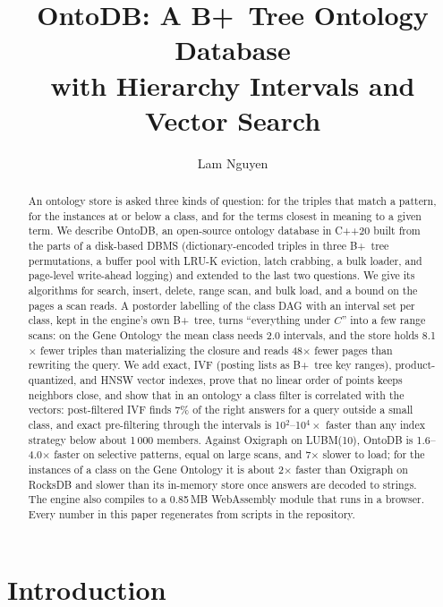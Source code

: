 \documentclass[sigconf, nonacm]{acmart}
\newcommand{\sys}{OntoDB}
\begin{document}
\title{OntoDB: A B+~Tree Ontology Database\\with Hierarchy Intervals and Vector Search}
\author{Lam Nguyen}

\renewcommand{\shortauthors}{Nguyen}

\begin{abstract}
An ontology store is asked three kinds of question: for the triples that match a pattern, for the instances at or below a class, and for the terms closest in meaning to a given term. We describe \sys, an open-source ontology database in C++20 built from the parts of a disk-based DBMS (dictionary-encoded triples in three B+~tree permutations, a buffer pool with LRU-K eviction, latch crabbing, a bulk loader, and page-level write-ahead logging) and extended to the last two questions. We give its algorithms for search, insert, delete, range scan, and bulk load, and a bound on the pages a scan reads. A postorder labelling of the class DAG with an interval set per class, kept in the engine's own B+~tree, turns ``everything under $C$'' into a few range scans: on the Gene Ontology the mean class needs 2.0 intervals, and the store holds 8.1$\times$ fewer triples than materializing the closure and reads 48$\times$ fewer pages than rewriting the query. We add exact, IVF (posting lists as B+~tree key ranges), product-quantized, and HNSW vector indexes, prove that no linear order of points keeps neighbors close, and show that in an ontology a class filter is correlated with the vectors: post-filtered IVF finds 7\% of the right answers for a query outside a small class, and exact pre-filtering through the intervals is 10$^2$--10$^4\times$ faster than any index strategy below about 1\,000 members. Against Oxigraph on LUBM(10), \sys{} is 1.6--4.0$\times$ faster on selective patterns, equal on large scans, and 7$\times$ slower to load; for the instances of a class on the Gene Ontology it is about 2$\times$ faster than Oxigraph on RocksDB and slower than its in-memory store once answers are decoded to strings. The engine also compiles to a 0.85\,MB WebAssembly module that runs in a browser. Every number in this paper regenerates from scripts in the repository.
\end{abstract}

\maketitle

\section{Introduction}
\end{document}
